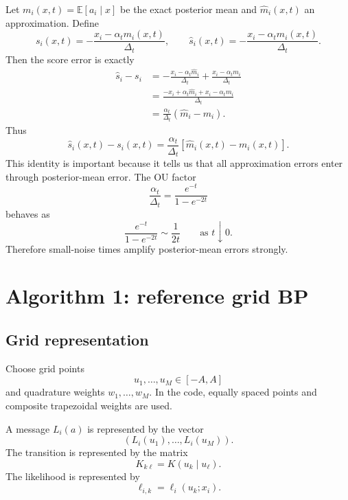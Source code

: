 \documentclass[11pt]{article}
\newcommand{\E}{\mathbb{E}}
\begin{document}
Let \(m_i(x,t)=\E[a_i\mid x]\) be the exact posterior mean and \(\widehat m_i(x,t)\) an approximation. Define
\begin{equation}
  s_i(x,t)=-\frac{x_i-\alpha_t m_i(x,t)}{\Delta_t},
  \qquad
  \widehat s_i(x,t)=-\frac{x_i-\alpha_t\widehat m_i(x,t)}{\Delta_t}.
\end{equation}
Then the score error is exactly
\begin{align}
  \widehat s_i-s_i
  &= -\frac{x_i-\alpha_t\widehat m_i}{\Delta_t}
  +\frac{x_i-\alpha_t m_i}{\Delta_t}\\
  &= \frac{-x_i+\alpha_t\widehat m_i+x_i-\alpha_t m_i}{\Delta_t}\\
  &= \frac{\alpha_t}{\Delta_t}(\widehat m_i-m_i).
\end{align}
Thus
\begin{equation}
  \boxed{
  \widehat s_i(x,t)-s_i(x,t)
  = \frac{\alpha_t}{\Delta_t}\left[\widehat m_i(x,t)-m_i(x,t)\right].
  }
  \label{eq:error-identity}
\end{equation}
This identity is important because it tells us that all approximation errors enter through posterior-mean error. The OU factor
\begin{equation}
  \frac{\alpha_t}{\Delta_t}=\frac{e^{-t}}{1-e^{-2t}}
\end{equation}
behaves as
\begin{equation}
  \frac{e^{-t}}{1-e^{-2t}}\sim \frac{1}{2t}
  \qquad \text{as }t\downarrow 0.
\end{equation}
Therefore small-noise times amplify posterior-mean errors strongly.

\section{Algorithm 1: reference grid BP}

\subsection{Grid representation}

Choose grid points
\begin{equation}
  u_1,\ldots,u_M\in[-A,A]
\end{equation}
and quadrature weights \(w_1,\ldots,w_M\). In the code, equally spaced points and composite trapezoidal weights are used.

A message \(L_i(a)\) is represented by the vector
\begin{equation}
  (L_i(u_1),\ldots,L_i(u_M)).
\end{equation}
The transition is represented by the matrix
\begin{equation}
  K_{k\ell}=K(u_k\mid u_\ell).
\end{equation}
The likelihood is represented by
\begin{equation}
  \ell_{i,k}=\ell_i(u_k;x_i).
\end{equation}
\end{document}
